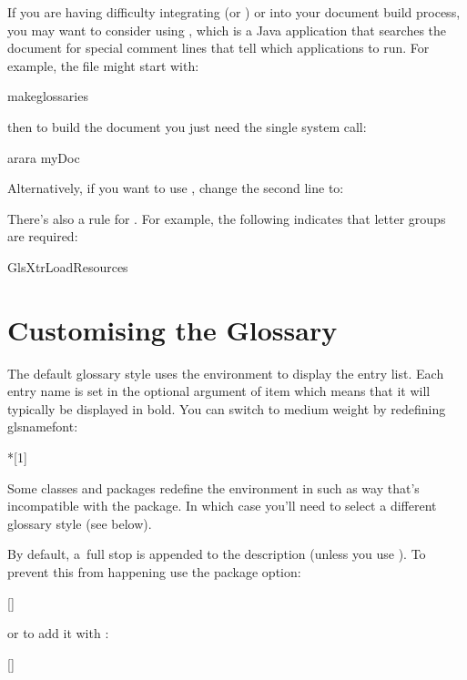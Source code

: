 \documentclass[titlepage=false,oneside,
 fontsize=12pt,captions=tableheading]{scrarticle}
\begin{document}
If you are having difficulty integrating  (or
) or 
into your document build process, you may want to consider using
, which is a Java application that searches the
document for special comment lines that tell  which
applications to run. For example, the file  might
start with:
\begin{codebox}
\gls{makeglossaries}
\end{codebox}
then to build the document you just need the single system call:
\begin{terminal}
arara myDoc
\end{terminal}
Alternatively, if you want to use , change
the second line to:
\begin{compactcodebox}
\end{compactcodebox}
There's also a rule for . For example, the following
indicates that letter groups are required:
\begin{codebox}
\gls{GlsXtrLoadResources}
\end{codebox}

\section{Customising the Glossary}
\label{sec:glosstyle}

The default glossary style uses the  environment
to display the entry list. Each entry name is set in the optional
argument of \gls{item} which means that it will typically be
displayed in bold. You can switch to medium weight by redefining
\gls{glsnamefont}:
\begin{codebox}
*[1]
\end{codebox}
Some classes and packages redefine the  environment
in such as way that's incompatible with the 
package. In which case you'll need to select a different glossary
style (see below).

By default, a~full stop is appended to the description (unless you
use ). To prevent
this from happening use the  package option:
\begin{codebox}
[]
\end{codebox}
or to add it with :
\begin{codebox}
[]
\end{codebox}
\end{document}
